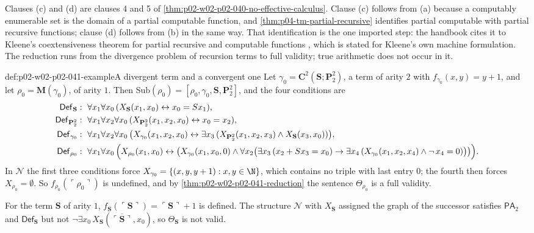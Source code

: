 Clauses (c) and (d) are clauses 4 and 5 of
\cref{thm:p02-w02-p02-040-no-effective-calculus}.  Clause (c) follows from (a)
because a computably enumerable set is the domain of a partial computable
function, and \cref{thm:p04-tm-partial-recursive} identifies partial
computable with partial recursive functions; clause (d) follows from (b) in the
same way.  That identification is the one imported step: the handbook cites
it to Kleene's coextensiveness theorem for partial recursive and computable
functions \cite[\S69, Theorem~XXX, p.~376]{Kleene1952}, which is stated for
Kleene's own machine formulation.  The reduction runs
from the divergence problem of recursion terms to full validity; true
arithmetic does not occur in it.

\begin{hbexample}{def:p02-w02-p02-041-example}{A divergent term and a convergent one}
Let \(\gamma_0=\mathbf C^2(\mathbf S;\mathbf P^2_2)\), a term of arity
\(2\) with \(f_{\gamma_0}(x,y)=y+1\), and let \(\rho_0=\mathbf M(\gamma_0)\),
of arity \(1\).  Then
\(\mathrm{Sub}(\rho_0)=[\rho_0,\gamma_0,\mathbf S,\mathbf P^2_2]\), and the four
conditions are
\[
\begin{aligned}
 \mathsf{Def}_{\mathbf S}&:\ \forall x_1\forall x_0\,(X_{\mathbf S}(x_1,x_0)\leftrightarrow x_0=Sx_1),\\
 \mathsf{Def}_{\mathbf P^2_2}&:\ \forall x_1\forall x_2\forall x_0\,(X_{\mathbf P^2_2}(x_1,x_2,x_0)\leftrightarrow x_0=x_2),\\
 \mathsf{Def}_{\gamma_0}&:\ \forall x_1\forall x_2\forall x_0\,\bigl(X_{\gamma_0}(x_1,x_2,x_0)\leftrightarrow
   \exists x_3\,(X_{\mathbf P^2_2}(x_1,x_2,x_3)\land X_{\mathbf S}(x_3,x_0))\bigr),\\
 \mathsf{Def}_{\rho_0}&:\ \forall x_1\forall x_0\,\Bigl(X_{\rho_0}(x_1,x_0)\leftrightarrow
   \bigl(X_{\gamma_0}(x_1,x_0,0)\land\forall x_2\bigl(\exists x_3\,(x_2+Sx_3=x_0)\to
   \exists x_4\,(X_{\gamma_0}(x_1,x_2,x_4)\land\neg\,x_4=0)\bigr)\bigr)\Bigr).
\end{aligned}
\]
In \(\mathcal N\) the first three conditions force
\(X_{\gamma_0}=\{(x,y,y+1):x,y\in\N\}\), which contains no triple with last
entry \(0\); the fourth then forces \(X_{\rho_0}=\emptyset\).  So
\(f_{\rho_0}(\ulcorner\rho_0\urcorner)\) is undefined, and by
\cref{thm:p02-w02-p02-041-reduction} the sentence \(\Theta_{\rho_0}\) is a full
validity.

For the term \(\mathbf S\) of arity \(1\), \(f_{\mathbf S}(\ulcorner\mathbf S\urcorner)=\ulcorner\mathbf S\urcorner+1\)
is defined.  The structure \(\mathcal N\) with \(X_{\mathbf S}\) assigned the
graph of the successor satisfies \(\mathsf{PA}_2\) and
\(\mathsf{Def}_{\mathbf S}\) but not
\(\neg\exists x_0\,X_{\mathbf S}(\overline{\ulcorner\mathbf S\urcorner},x_0)\), so
\(\Theta_{\mathbf S}\) is not valid.
\end{hbexample}

